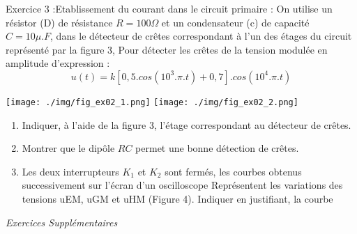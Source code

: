 \documentclass[12pt, french]{article}
\begin{document}
\begin{Box2}{Exercice 3 :Etablissement du courant dans le circuit primaire : }
On utilise un résistor (D) de résistance $R= 100\Omega$ et un
condensateur (c) de capacité $C = 10\mu.F$, dans le détecteur de
crêtes correspondant à l’un des étages du circuit représenté
par la figure 3,
Pour détecter les crêtes de la tension modulée en
amplitude d’expression :
$$u(t) = k[0,5.cos(10^3.\pi.t) + 0,7].cos(10^4.\pi.t)$$
  \begin{center}
	\texttt{[image: ./img/fig\_ex02\_1.png]}
	\texttt{[image: ./img/fig\_ex02\_2.png]}
  \end{center}
\begin{enumerate}
\item  Indiquer, à l’aide de la figure 3, l’étage correspondant au détecteur de crêtes.
\item  Montrer que le dipôle $RC$ permet une bonne détection de crêtes.
\item  Les deux interrupteurs $K_1$ et $K_2$ sont fermés,
les courbes obtenus successivement sur l’écran
d’un oscilloscope
Représentent les variations des tensions uEM, uGM et uHM (Figure 4). Indiquer en justifiant, la courbe
\end{enumerate}

\end{Box2}


\begin{center}
\vspace{-0.7cm}
   \Large{ \em{Exercices Supplémentaires}}
\end{center}

\vspace{-0.7cm}
\end{document}
